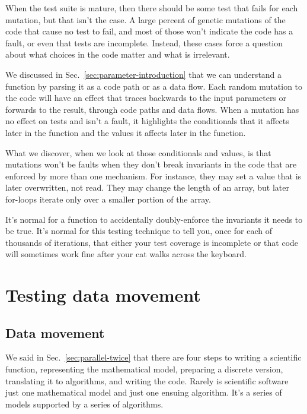 \documentclass[fleqn,10pt]{olplainarticle}
\begin{document}
When the test suite is mature, then there should be some test
that fails for each mutation, but that isn't the case. A
large percent of genetic mutations of the code that
cause no test to fail, and most of those won't indicate the
code has a fault, or even that tests are incomplete. Instead,
these cases force a question about what choices in the code
matter and what is irrelevant.

We discussed in Sec.~\ref{sec:parameter-introduction} that
we can understand a function by parsing it as a code path
or as a data flow. Each random mutation to the code will
have an effect that traces backwards to the input parameters
or forwards to the result, through code paths and data flows.
When a mutation has no effect on tests and isn't a fault,
it highlights the conditionals that it affects later in the function
and the values it affects later in the function.

What we discover, when we look at those conditionals and
values, is that mutations won't be faults when they don't
break invariants in the code that are enforced by more than
one mechanism. For instance, they may set a value that is
later overwritten, not read. They may change the length
of an array, but later for-loops iterate only over a smaller
portion of the array.

It's normal for a function to accidentally doubly-enforce
the invariants it needs to be true. It's normal for this testing
technique to tell you, once for each of thousands of iterations,
that either your test coverage is incomplete or that
code will sometimes work fine after your cat walks across
the keyboard.


\section{Testing data movement}\label{sec:data-movement}

\subsection{Data movement}\label{sec:movement-movement}

We said in Sec.~\ref{sec:parallel-twice} that there are four
steps to writing a scientific function, representing the mathematical model,
preparing a discrete version, translating it to algorithms,
and writing the code.
Rarely is scientific software just one mathematical model
and just one ensuing algorithm. It's a series of models supported
by a series of algorithms.
\end{document}
